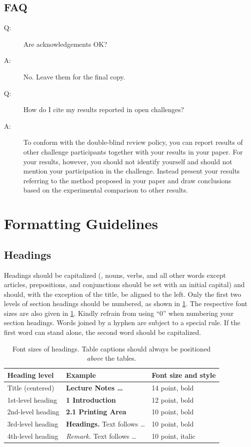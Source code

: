 \documentclass[runningheads]{llncs}
\begin{document}
\subsection*{FAQ}
\begin{description}
  \item[Q:] Are acknowledgements OK?
  \item[A:] No.  Leave them for the final copy.
  \medskip
  \item[Q:] How do I cite my results reported in open challenges?
  \item[A:] To conform with the double-blind review policy, you can report results of other challenge participants together with your results in your paper.
    For your results, however, you should not identify yourself and should not mention your participation in the challenge.
    Instead present your results referring to the method proposed in your paper and draw conclusions based on the experimental comparison to other results.
\end{description}


\section{Formatting Guidelines}

\subsection{Headings}
Headings should be capitalized (\ie, nouns, verbs, and all other words except articles, prepositions, and conjunctions should be set with an initial capital) and should, with the exception of the title, be aligned to the left.
Only the first two levels of section headings should be numbered, as shown in \cref{tab:headings}.
The respective font sizes are also given in \cref{tab:headings}. 
Kindly refrain from using ``0'' when numbering your section headings.
Words joined by a hyphen are subject to a special rule. 
If the first word can stand alone, the second word should be capitalized.

\begin{table}[tb]
  \caption{Font sizes of headings. 
    Table captions should always be positioned \emph{above} the tables.
  }
  \label{tab:headings}
  \centering
  \begin{tabular}{@{}lll@{}}
    \toprule
    Heading level & Example & Font size and style\\
    \midrule
    Title (centered)  & {\Large\bf Lecture Notes \dots} & 14 point, bold\\
    1st-level heading & {\large\bf 1 Introduction} & 12 point, bold\\
    2nd-level heading & {\bf 2.1 Printing Area} & 10 point, bold\\
    3rd-level heading & {\bf Headings.} Text follows \dots & 10 point, bold\\
    4th-level heading & {\it Remark.} Text follows \dots & 10 point, italic\\
  \bottomrule
  \end{tabular}
\end{table}
\end{document}
